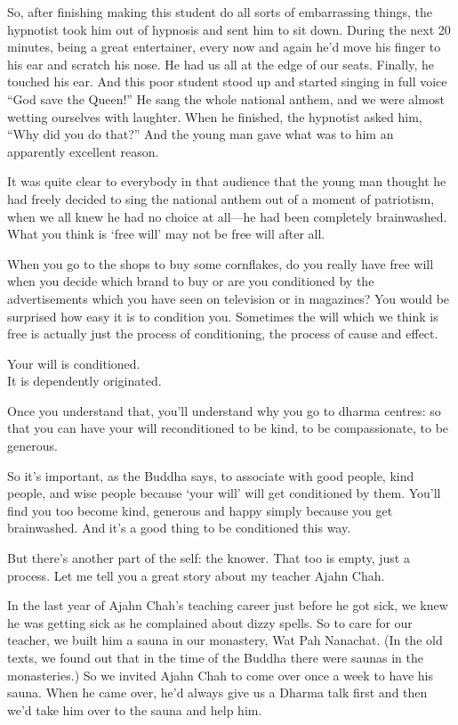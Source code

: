 \documentclass[12pt, openany]{book}
\newenvironment{aphorism}%
{%
\begin{center}\begin{itshape}
}%
{\end{itshape}\end{center}
}%
\begin{document}
So, after finishing making this student do all sorts of embarrassing things, the hypnotist took him out of hypnosis and sent him to sit down. During the next 20 minutes, being a great entertainer, every now and again he’d move his finger to his ear and scratch his nose. He had us all at the edge of our seats. Finally, he touched his ear. And this poor student stood up and started singing in full voice “God save the Queen!” He sang the whole national anthem, and we were almost wetting ourselves with laughter. When he finished, the hypnotist asked him, “Why did you do that?” And the young man gave what was to him an apparently excellent reason. 

It was quite clear to everybody in that audience that the young man thought he had freely decided to sing the national anthem out of a moment of patriotism, when we all knew he had no choice at all—he had been completely brainwashed. What you think is ‘free will’ may not be free will after all. 

When you go to the shops to buy some cornflakes, do you really have free will when you decide which brand to buy or are you conditioned by the advertisements which you have seen on television or in magazines? You would be surprised how easy it is to condition you. Sometimes the will which we think is free is actually just the process of conditioning, the process of cause and effect. 

\begin{aphorism}
Your will is conditioned.\\  
It is dependently originated.
\end{aphorism}

Once you understand that, you’ll understand why you go to dharma centres: so that you can have your will reconditioned to be kind, to be compassionate, to be generous. 

So it’s important, as the Buddha says, to associate with good people, kind people, and wise people because ‘your will’ will get conditioned by them. You’ll find you too become kind, generous and happy simply because you get brainwashed. And it’s a good thing to be conditioned this way. 

But there’s another part of the self: the knower. That too is empty, just a process. Let me tell you a great story about my teacher Ajahn Chah. 

In the last year of Ajahn Chah’s teaching career just before he got sick, we knew he was getting sick as he complained about dizzy spells. So to care for our teacher, we built him a sauna in our monastery, Wat Pah Nanachat. (In the old texts, we found out that in the time of the Buddha there were saunas in the monasteries.) So we invited Ajahn Chah to come over once a week to have his sauna. When he came over, he’d always give us a Dharma talk first and then we’d take him over to the sauna and help him. 
\end{document}
